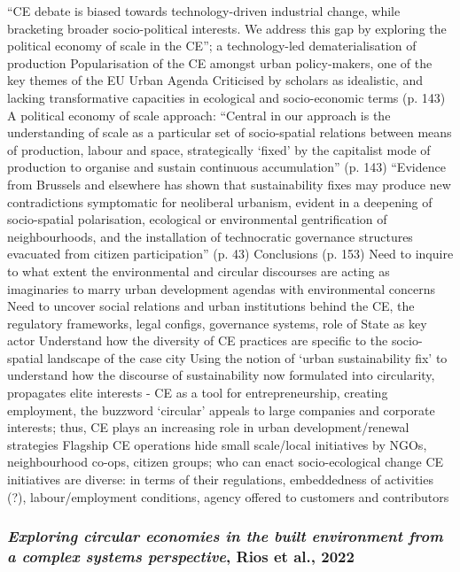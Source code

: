 \documentclass{article}
\begin{document}
\begin{outline}
	\1 ``CE debate is biased towards technology-driven industrial change, while bracketing broader socio-political interests. We address this gap by exploring the political economy of scale in the CE''; a technology-led dematerialisation of production
	\1 Popularisation of the CE amongst urban policy-makers, one of the key themes of the EU Urban Agenda
	\1 Criticised by scholars as idealistic, and lacking transformative capacities in ecological and socio-economic terms (p. 143)
	\1 A political economy of scale approach:
		\2 ``Central in our approach is the understanding of scale as a particular set of socio-spatial relations between means of production, labour and space, strategically `fixed' by the capitalist mode of production to organise and sustain continuous accumulation'' (p. 143)
		\2 ``Evidence from Brussels and elsewhere has shown that sustainability fixes may produce new contradictions symptomatic for neoliberal urbanism, evident in a deepening of socio-spatial polarisation, ecological or environmental gentrification of neighbourhoods, and the installation of technocratic governance structures evacuated from citizen participation'' (p. 43)
	\1 Conclusions (p. 153)
		\2 Need to inquire to what extent the environmental and circular discourses are acting as imaginaries to marry urban development agendas with environmental concerns
		\2 Need to uncover social relations and urban institutions behind the CE, the regulatory frameworks, legal configs, governance systems, role of State as key actor
		\2 Understand how the diversity of CE practices are specific to the socio-spatial landscape of the case city
		\2 Using the notion of `urban sustainability fix' to understand how the discourse of sustainability now formulated into circularity, propagates elite interests - CE as a tool for entrepreneurship, creating employment, the buzzword `circular' appeals to large companies and corporate interests; thus, CE plays an increasing role in urban development/renewal strategies
		\2 Flagship CE operations hide small scale/local initiatives by NGOs, neighbourhood co-ops, citizen groups; who can enact socio-ecological change
		\2 CE initiatives are diverse: in terms of their regulations, embeddedness of activities (?), labour/employment conditions, agency offered to customers and contributors
\end{outline}

\subsubsection{\textit{Exploring circular economies in the built environment from a complex systems perspective}, Rios et al., 2022}
\end{document}
